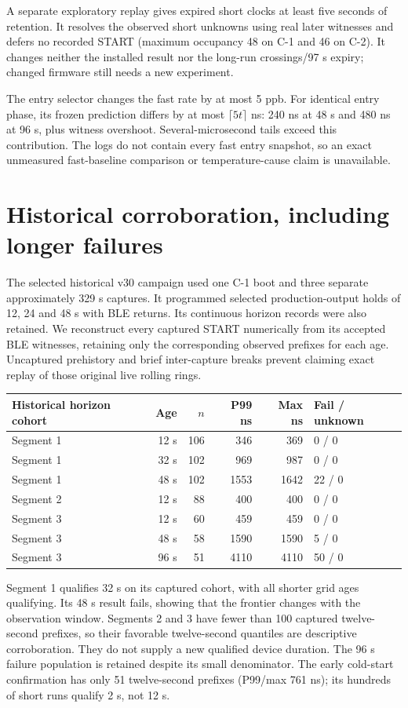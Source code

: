 \documentclass[11pt,letterpaper]{article}
\begin{document}
A separate exploratory replay gives expired short clocks at least five seconds
of retention. It resolves the observed short unknowns using real later witnesses
and defers no recorded START (maximum occupancy 48 on C-1 and 46 on C-2).
It changes neither the installed result nor the long-run crossings/97 s expiry;
changed firmware still needs a new experiment.

The entry selector changes the fast rate by at most 5 ppb. For identical entry
phase, its frozen prediction differs by at most $\lceil5t\rceil$ ns: 240 ns at
48 s and 480 ns at 96 s, plus witness overshoot. Several-microsecond tails exceed
this contribution. The logs do not contain every fast entry snapshot, so an
exact unmeasured fast-baseline comparison or temperature-cause claim is unavailable.
\newpage
\section{Historical corroboration, including longer failures}
The selected historical v30 campaign used one C-1 boot and three separate approximately 329 s captures. It programmed selected production-output holds of 12, 24 and 48 s with BLE returns. Its continuous horizon records were also retained. We reconstruct every captured START numerically from its accepted BLE witnesses, retaining only the corresponding observed prefixes for each age. Uncaptured prehistory and brief inter-capture breaks prevent claiming exact replay of those original live rolling rings.

\begin{center}\small
\begin{tabular}{L{.26\linewidth}rrrrL{.13\linewidth}}\toprule
Historical horizon cohort & Age & $n$ & P99 ns & Max ns & Fail / unknown\\\midrule
Segment 1 & 12 s & 106 & 346 & 369 & 0 / 0\\
Segment 1 & 32 s & 102 & 969 & 987 & 0 / 0\\
Segment 1 & 48 s & 102 & 1553 & 1642 & 22 / 0\\
Segment 2 & 12 s & 88 & 400 & 400 & 0 / 0\\
Segment 3 & 12 s & 60 & 459 & 459 & 0 / 0\\
Segment 3 & 48 s & 58 & 1590 & 1590 & 5 / 0\\
Segment 3 & 96 s & 51 & 4110 & 4110 & 50 / 0\\\bottomrule
\end{tabular}
\end{center}\vspace{-5pt}
Segment 1 qualifies 32 s on its captured cohort, with all shorter grid ages qualifying. Its 48 s result fails, showing that the frontier changes with the observation window. Segments 2 and 3 have fewer than 100 captured twelve-second prefixes, so their favorable twelve-second quantiles are descriptive corroboration. They do not supply a new qualified device duration. The 96 s failure population is retained despite its small denominator. The early cold-start confirmation has only 51 twelve-second prefixes (P99/max 761 ns); its hundreds of short runs qualify 2 s, not 12 s.
\end{document}
